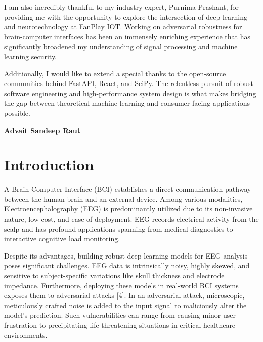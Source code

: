 \documentclass[10pt,a4paper,openright]{report}
\begin{document}
\par\noindent
I am also incredibly thankful to my industry expert, Purnima Prashant, for providing me with the opportunity to explore the intersection of deep learning and neurotechnology at FanPlay IOT. Working on adversarial robustness for brain-computer interfaces has been an immensely enriching experience that has significantly broadened my understanding of signal processing and machine learning security.

\par\noindent
Additionally, I would like to extend a special thanks to the open-source communities behind FastAPI, React, and SciPy. The relentless pursuit of robust software engineering and high-performance system design is what makes bridging the gap between theoretical machine learning and consumer-facing applications possible.

\vfill
\hfill\textbf{Advait Sandeep Raut}
\clearpage

\tableofcontents
\clearpage

\chapter{Introduction}

A Brain-Computer Interface (BCI) establishes a direct communication pathway between the human brain and an external device. Among various modalities, Electroencephalography (EEG) is predominantly utilized due to its non-invasive nature, low cost, and ease of deployment. EEG records electrical activity from the scalp and has profound applications spanning from medical diagnostics to interactive cognitive load monitoring.

Despite its advantages, building robust deep learning models for EEG analysis poses significant challenges. EEG data is intrinsically noisy, highly skewed, and sensitive to subject-specific variations like skull thickness and electrode impedance. Furthermore, deploying these models in real-world BCI systems exposes them to adversarial attacks [4]. In an adversarial attack, microscopic, meticulously crafted noise is added to the input signal to maliciously alter the model’s prediction. Such vulnerabilities can range from causing minor user frustration to precipitating life-threatening situations in critical healthcare environments.
\end{document}
